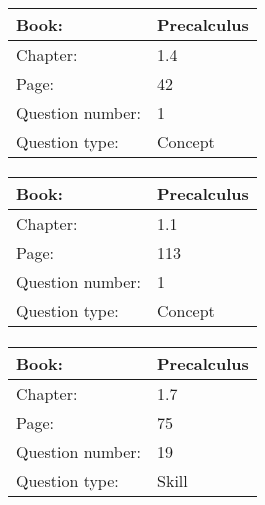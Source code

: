 \documentclass{article}
\begin{document}
            \paragraph{}
            \begin{tabularx}{1\textwidth}{
                    p{}
                    p{}
                }
                \toprule
                Book: & Precalculus
                \\
                \midrule
                Chapter: & 1.4
                \\
                \midrule
                Page: & 42
                \\
                \midrule
                Question number: & 1
                \\
                \midrule
                Question type: & Concept
                \\
                \bottomrule
            \end{tabularx}
            
            \paragraph{}
            \begin{tabularx}{1\textwidth}{
                    p{}
                    p{}
                }
                \toprule
                Book: & Precalculus
                \\
                \midrule
                Chapter: & 1.1
                \\
                \midrule
                Page: & 113
                \\
                \midrule
                Question number: & 1
                \\
                \midrule
                Question type: & Concept
                \\
                \bottomrule
            \end{tabularx}
            
            \paragraph{}
            \begin{tabularx}{1\textwidth}{
                    p{}
                    p{}
                }
                \toprule
                Book: & Precalculus
                \\
                \midrule
                Chapter: & 1.7
                \\
                \midrule
                Page: & 75
                \\
                \midrule
                Question number: & 19
                \\
                \midrule
                Question type: & Skill
                \\
                \bottomrule
            \end{tabularx}
            
\end{document}
